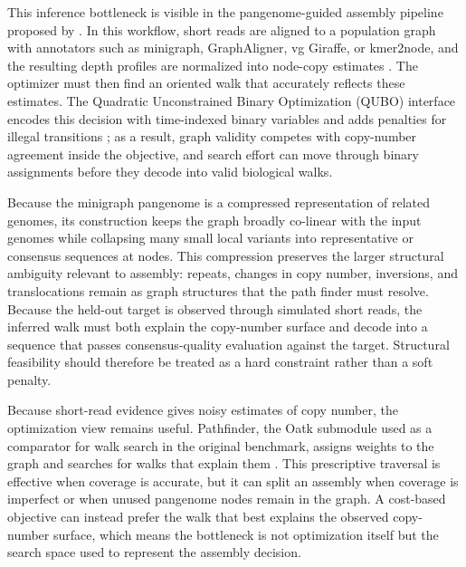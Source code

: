 \documentclass[11pt]{article}
\begin{document}
This inference bottleneck is visible in the pangenome-guided assembly pipeline proposed by \citet{cudby2026pangenome}. In this workflow, short reads are aligned to a population graph with annotators such as minigraph, GraphAligner, vg Giraffe, or kmer2node, and the resulting depth profiles are normalized into node-copy estimates \citep{li2020minigraph,rautiainen2020graphaligner,siren2021giraffe,cudby2026pangenome}. The optimizer must then find an oriented walk that accurately reflects these estimates. The Quadratic Unconstrained Binary Optimization (QUBO) interface encodes this decision with time-indexed binary variables and adds penalties for illegal transitions \citep{cudby2026pangenome,dunning2018mqlib}; as a result, graph validity competes with copy-number agreement inside the objective, and search effort can move through binary assignments before they decode into valid biological walks.

Because the minigraph pangenome is a compressed representation of related genomes, its construction keeps the graph broadly co-linear with the input genomes while collapsing many small local variants into representative or consensus sequences at nodes. This compression preserves the larger structural ambiguity relevant to assembly: repeats, changes in copy number, inversions, and translocations remain as graph structures that the path finder must resolve. Because the held-out target is observed through simulated short reads, the inferred walk must both explain the copy-number surface and decode into a sequence that passes consensus-quality evaluation against the target. Structural feasibility should therefore be treated as a hard constraint rather than a soft penalty.

Because short-read evidence gives noisy estimates of copy number, the optimization view remains useful. Pathfinder, the Oatk submodule used as a comparator for walk search in the original benchmark, assigns weights to the graph and searches for walks that explain them \citep{zhou2025oatk,cudby2026pangenome}. This prescriptive traversal is effective when coverage is accurate, but it can split an assembly when coverage is imperfect or when unused pangenome nodes remain in the graph. A cost-based objective can instead prefer the walk that best explains the observed copy-number surface, which means the bottleneck is not optimization itself but the search space used to represent the assembly decision.
\end{document}
